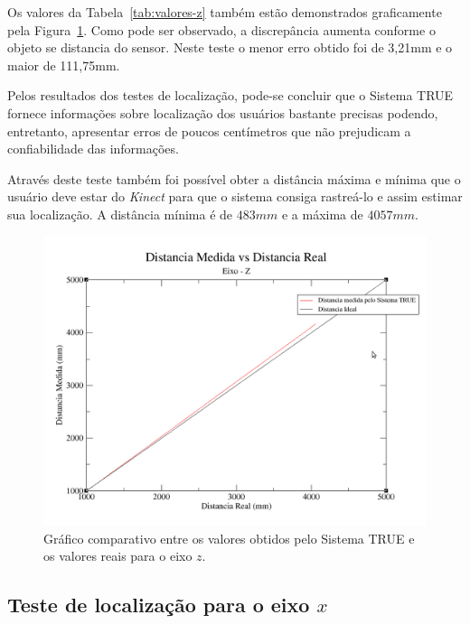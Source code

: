 	Os valores da Tabela~\ref{tab:valores-z} também estão demonstrados graficamente
	pela Figura~\ref{fig:grafico-z}. Como pode ser observado, a discrepância
	aumenta conforme o objeto se distancia do sensor. Neste teste o menor erro
	obtido foi de 3,21mm e o maior de 111,75mm.
	
	Pelos resultados dos testes de localização, pode-se concluir que o
	Sistema TRUE fornece informações sobre localização dos usuários bastante
	precisas podendo, entretanto, apresentar erros de poucos centímetros que não
	prejudicam a confiabilidade das informações.

	Através deste teste também foi possível obter a distância máxima e mínima que o
	usuário deve estar do \textit{Kinect} para que o sistema consiga rastreá-lo e
	assim estimar sua localização. A distância mínima é de $\displaystyle 483mm$
	e a máxima de $\displaystyle 4057mm$.

	\begin{figure}[H]
		\begin{center}
			\includegraphics[scale=0.4]{figuras/5.Testes/grafico-eixo-z.png}
		\end{center}
		\caption{Gráfico comparativo entre os valores obtidos pelo Sistema TRUE e os
		valores reais para o eixo $\displaystyle z$.}
		\label{fig:grafico-z}
	\end{figure}

\subsection{Teste de localização para o eixo $\displaystyle x$}

